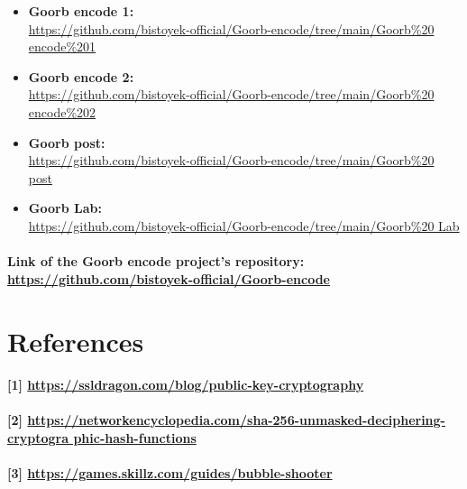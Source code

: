 \documentclass[oneside]{book}
\newcommand{\myparagraph}[1]{\paragraph{\textnormal{#1}}}
\begin{document}
\begin{itemize}
    \item \textbf{Goorb encode 1:} \\ \href{https://github.com/bistoyek-official/Goorb-encode/tree/main/Goorb\%20enco \newline de\%201}{https://github.com/bistoyek-official/Goorb-encode/tree/main/Goorb\%20 \newline encode\%201}
    \item \textbf{Goorb encode 2:} \\ \href{https://github.com/bistoyek-official/Goorb-encode/tree/main/Goorb\%20encode\%202}{https://github.com/bistoyek-official/Goorb-encode/tree/main/Goorb\%20 \newline encode\%202} 
    \item \textbf{Goorb post:} \\ \href{https://github.com/bistoyek-official/Goorb-encode/tree/main/Goorb\%20post}{https://github.com/bistoyek-official/Goorb-encode/tree/main/Goorb\%20 \newline post} 
    \item \textbf{Goorb Lab:} \\ \href{https://github.com/bistoyek-official/Goorb-encode/tree/main/Goorb\%20Lab}{https://github.com/bistoyek-official/Goorb-encode/tree/main/Goorb\%20 \newline Lab}
\end{itemize}

\myparagraph{
Link of the \textbf{Goorb encode} project's repository:\\
\href{https://github.com/bistoyek-official/Goorb-encode}{https://github.com/bistoyek-official/Goorb-encode}
}

\newpage

\section{References}

\myparagraph{
[1] \href{https://ssldragon.com/blog/public-key-cryptography}{https://ssldragon.com/blog/public-key-cryptography}
}

\myparagraph{
[2] \href{https://networkencyclopedia.com/sha-256-unmasked-deciphering-cryptographic-hash-functions}{https://networkencyclopedia.com/sha-256-unmasked-deciphering-cryptogra \newline phic-hash-functions}
}

\myparagraph{
[3] \href{https://games.skillz.com/guides/bubble-shooter}{https://games.skillz.com/guides/bubble-shooter}
}
\end{document}
